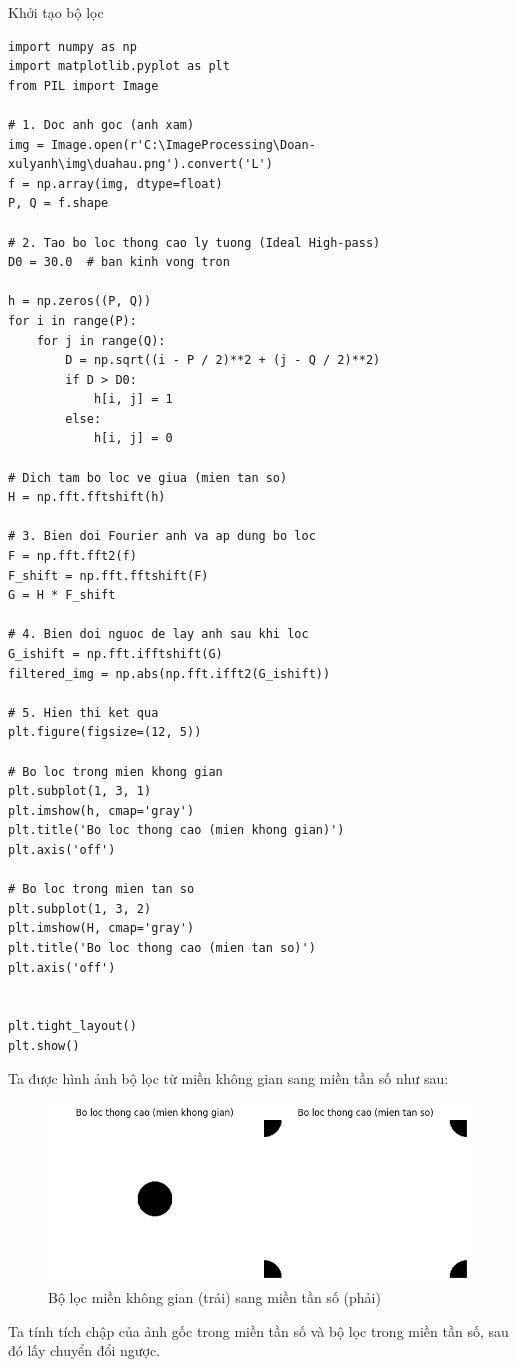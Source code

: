 \documentclass[12pt,a4paper]{report}
\numberwithin{equation}{section}
\theoremstyle{definition} %
\begin{document}
Khởi tạo bộ lọc 
\begin{lstlisting}
import numpy as np
import matplotlib.pyplot as plt
from PIL import Image

# 1. Doc anh goc (anh xam)
img = Image.open(r'C:\ImageProcessing\Doan-xulyanh\img\duahau.png').convert('L')
f = np.array(img, dtype=float)
P, Q = f.shape

# 2. Tao bo loc thong cao ly tuong (Ideal High-pass)
D0 = 30.0  # ban kinh vong tron

h = np.zeros((P, Q))
for i in range(P):
    for j in range(Q):
        D = np.sqrt((i - P / 2)**2 + (j - Q / 2)**2)
        if D > D0:
            h[i, j] = 1
        else:
            h[i, j] = 0

# Dich tam bo loc ve giua (mien tan so)
H = np.fft.fftshift(h)

# 3. Bien doi Fourier anh va ap dung bo loc
F = np.fft.fft2(f)
F_shift = np.fft.fftshift(F)
G = H * F_shift

# 4. Bien doi nguoc de lay anh sau khi loc
G_ishift = np.fft.ifftshift(G)
filtered_img = np.abs(np.fft.ifft2(G_ishift))

# 5. Hien thi ket qua
plt.figure(figsize=(12, 5))

# Bo loc trong mien khong gian
plt.subplot(1, 3, 1)
plt.imshow(h, cmap='gray')
plt.title('Bo loc thong cao (mien khong gian)')
plt.axis('off')

# Bo loc trong mien tan so
plt.subplot(1, 3, 2)
plt.imshow(H, cmap='gray')
plt.title('Bo loc thong cao (mien tan so)')
plt.axis('off')


plt.tight_layout()
plt.show()
\end{lstlisting}
Ta được hình ảnh bộ lọc từ miền không gian sang miền tần số như sau:

\begin{figure}[H]
\centering
\includegraphics[width=0.8\linewidth]{img/idealhighpass/IHPF-bolocKG-bolocTS.png}
\caption{Bộ lọc miền không gian (trái) sang miền tần số (phải)}
\end{figure}
Ta tính tích chập của ảnh gốc trong miền tần số và bộ lọc trong miền tần số, sau đó lấy chuyển đổi ngược.
\end{document}

